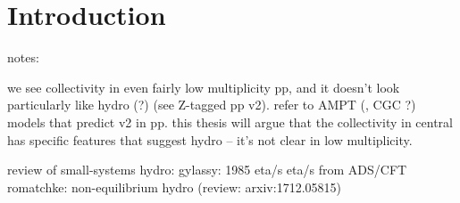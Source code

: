 \chapter{Introduction}
\label{ch:intro}


 notes:

 we see collectivity in even fairly low multiplicity pp, and it doesn't look particularly like hydro (?) (see Z-tagged pp v2). refer to AMPT (, CGC ?) models that predict v2 in pp. this thesis will argue that the collectivity in central \pPb has specific features that suggest hydro -- it's not clear in low multiplicity.

 review of small-systems hydro: \cite{Nagle:2018nvi}
 gylassy: 1985 eta/s \cite{Danielewicz:1984ww}
 eta/s from ADS/CFT \cite{Kovtun:2004de}
 romatchke: non-equilibrium hydro \cite{Romatschke:2016hle,Romatschke:2017vte} (review: arxiv:1712.05815)
